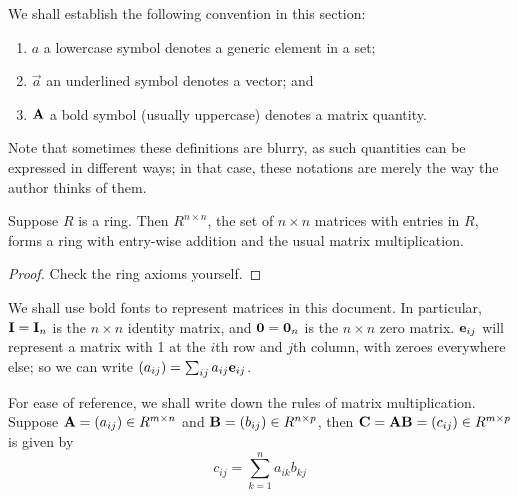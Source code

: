 \begin{remark}
    We shall establish the following convention in this section:
    \begin{enumerate}[label={(\roman*)}, itemsep=0mm]
        \item \(a\) a lowercase symbol denotes a generic element in a set;
        \item \(\vec{a}\) an underlined symbol denotes a vector; and
        \item \(\vb{A}\) a bold symbol (usually uppercase)
            denotes a matrix quantity.
    \end{enumerate}
    Note that sometimes these definitions are blurry,
    as such quantities can be expressed in different ways;
    in that case, these notations are merely the way the author thinks of them.
\end{remark}

\pagebreak

\begin{proposition}
    Suppose \(R\) is a ring.
    Then \(R^{n \times n}\),
    the set of \(n \times n\) matrices with entries in \(R\),
    forms a ring with entry-wise addition
    and the usual matrix multiplication.
\end{proposition}
\begin{proof}
    Check the ring axioms yourself.
\end{proof}
\begin{remark}
    We shall use bold fonts to represent matrices in this document.
    In particular, \(\vb{I} = \vb{I}_n\)
    is the \(n \times n\) identity matrix,
    and \(\vb{0} = \vb{0}_n\) is the \(n \times n\) zero matrix.
    \(\vb{e}_{ij}\) will represent a matrix
    with 1 at the \(i\)th row and \(j\)th column,
    with zeroes everywhere else;
    so we can write \((a_{ij}) = \sum_{ij} a_{ij}\vb{e}_{ij}\).
\end{remark}
\begin{remark}\label{rem:matrix-mult}
    For ease of reference,
    we shall write down the rules of matrix multiplication.
    Suppose \(\vb{A} = (a_{ij}) \in R^{m \times n}\)
    and \(\vb{B} = (b_{ij}) \in R^{n \times p}\),
    then \(\vb{C} = \vb{A}\vb{B} = (c_{ij}) \in R^{m \times p}\)
    is given by
    \begin{equation*}
        c_{ij} = \sum_{k=1}^n a_{ik}b_{kj}
    \end{equation*}
\end{remark}

